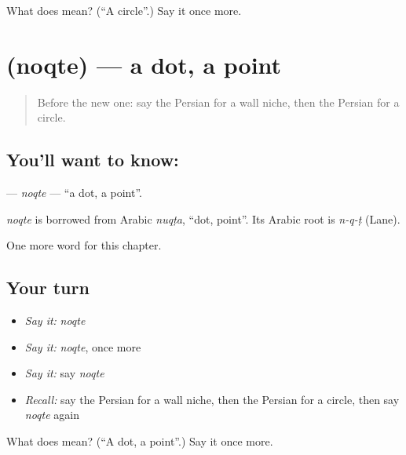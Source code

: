 \begin{tcolorbox}[breakable,colback=teal!4,colframe=teal!35!black,title={Before you move on}]
What does  mean? (\textquotedblleft{}A circle\textquotedblright{}.) Say it once more.
\end{tcolorbox}
\section[\texorpdfstring{\fa{نقطه} (noqte)}{نقطه (noqte)}]{ (noqte) — a dot, a point}

\label{lesson:FA-C213-noqte}



\begin{quote}
Before the new one: say the Persian for a wall niche, then the Persian for a circle.
\end{quote}

\subsection*{You'll want to know: }
\textbf{} — \emph{noqte} — \textquotedblleft{}a dot, a point\textquotedblright{}.

\begin{cousinweb}
\emph{noqte} is borrowed from Arabic \emph{nuqṭa}, \textquotedblleft{}dot, point\textquotedblright{}. Its Arabic root is \emph{n-q-ṭ} (Lane).
\end{cousinweb}

\begin{grammarlens}[title={What you've built}]
One more word for this chapter.
\end{grammarlens}

\subsection*{Your turn}
\begin{itemize}
\raggedright
  \item \emph{Say it:} \emph{noqte}
  \item \emph{Say it:} \emph{noqte}, once more
  \item \emph{Say it:} say \emph{noqte}
  \item \emph{Recall:} say the Persian for a wall niche, then the Persian for a circle, then say \emph{noqte} again
\end{itemize}

\begin{tcolorbox}[breakable,colback=teal!4,colframe=teal!35!black,title={Before you move on}]
What does  mean? (\textquotedblleft{}A dot, a point\textquotedblright{}.) Say it once more.
\end{tcolorbox}
